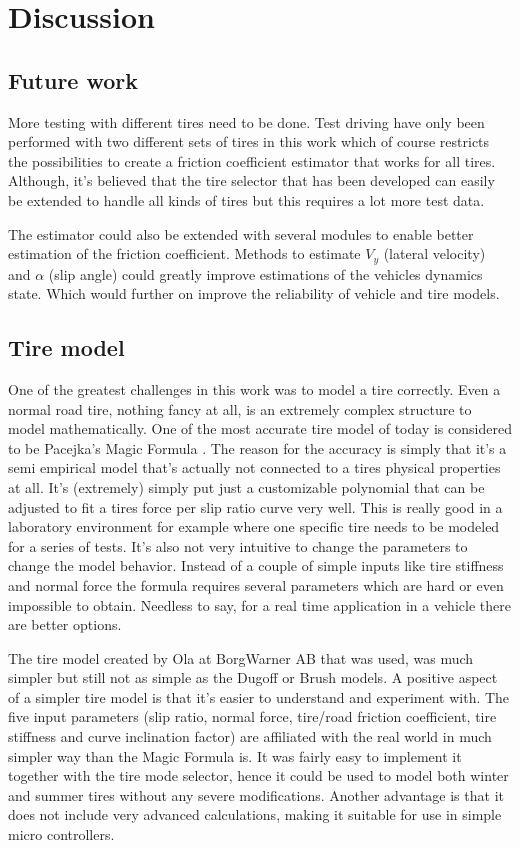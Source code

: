 \chapter{Discussion}

\section{Future work}
More testing with different tires need to be done. Test driving have only been performed with two different sets of tires in this work which of course restricts the possibilities to create a friction coefficient estimator that works for all tires. Although, it's believed that the tire selector that has been developed can easily be extended to handle all kinds of tires but this requires a lot more test data.

The estimator could also be extended with several modules to enable better estimation of the friction coefficient. Methods to estimate $ V_{y} $ (lateral velocity) and $ \alpha $ (slip angle) could greatly improve estimations of the vehicles dynamics state. Which would further on improve the reliability of vehicle and tire models.

\section{Tire model}
One of the greatest challenges in this work was to model a tire correctly. Even a normal road tire, nothing fancy at all, is an extremely complex structure to model mathematically. One of the most accurate tire model of today is considered to be Pacejka's Magic Formula \cite{pacejka}. The reason for the accuracy is simply that it's a semi empirical model that's actually not connected to a tires physical properties at all. It's (extremely) simply put just a customizable polynomial that can be adjusted to fit a tires force per slip ratio curve very well. This is really good in a laboratory environment for example where one specific tire needs to be modeled for a series of tests. It's also not very intuitive to change the parameters to change the model behavior. Instead of a couple of simple inputs like tire stiffness and normal force the formula requires several parameters which are hard or even impossible to obtain. Needless to say, for a real time application in a vehicle there are better options.

The tire model created by Ola at BorgWarner AB that was used, was much simpler but still not as simple as the Dugoff or Brush models. A positive aspect of a simpler tire model is that it's easier to understand and experiment with. The five input parameters (slip ratio, normal force, tire/road friction coefficient, tire stiffness and curve inclination factor) are affiliated with the real world in much simpler way than the Magic Formula is. It was fairly easy to implement it together with the tire mode selector, hence it could be used to model both winter and summer tires without any severe modifications. Another advantage is that it does not include very advanced calculations, making it suitable for use in simple micro controllers. 

